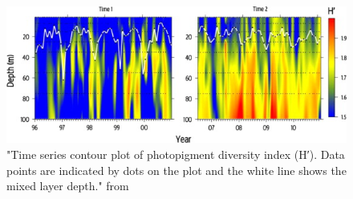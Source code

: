    
 
%
%
%
%
%
%
%
%
%
%
%

\begin{figure}
\centering
\includegraphics[trim = 0mm 0mm 0mm 0mm, clip, width=.8\linewidth]{./Chp3-Further/PinckneyDiversityPigmentData.jpg}
\caption[Scheme]{\small {"Time series contour plot of photopigment diversity index (H′). Data points are indicated by dots on the plot and the white line shows the mixed layer depth." from \citet{Pinckney2015}}}
\label{PrinComp}
\end{figure}


